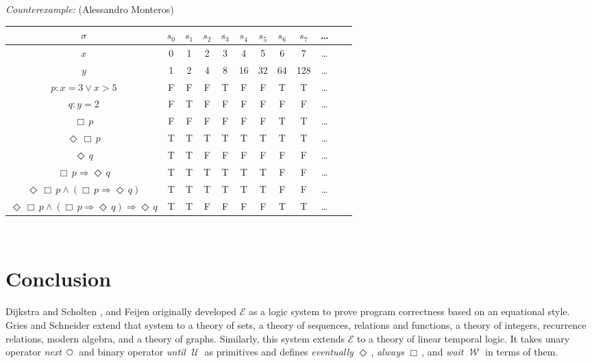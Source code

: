 \documentclass[12pt, fleqn, leqno]{article}
\newcommand{\lgap}{2pt}                             %
\newcommand{\lllgap}{12pt}                          %
\newcommand{\impl}{\ensuremath{\Rightarrow}}        %
\newcommand{\Until}{\;\mathcal{U}\;}
\newcommand{\Wait}{\;\mathcal{W}\;}
\newcommand{\Next}{\;\,\text{\raisebox{3.5pt}{\circle{6}}}}
\newcommand{\Event}{\Diamond\,}
\newcommand{\Always}{\Box\,}
\begin{document}
\emph{Counterexample:} (Alessandro Monteros)\\[\lgap]
\begin{tabular}{c|ccccccccccc}
  $\sigma$                                                     & $s_0$ & $s_1$ & $s_2$ & $s_3$ & $s_4$ & $s_5$ & $s_6$ & $s_7$ & \dots\\
  \hline
  $x$                                                          & 0     & 1     & 2     & 3     & 4     & 5     & 6     & 7     & \dots\\
  $y$                                                          & 1     & 2     & 4     & 8     & 16    & 32    & 64    & 128   & \dots\\
  $p: x=3\lor x>5$                                             & F     & F     & F     & T     & F     & F     & T     & T     & \dots\\
  $q: y=2$                                                     & F     & T     & F     & F     & F     & F     & F     & F     & \dots\\
  $\Always p$                                                  & F     & F     & F     & F     & F     & F     & T     & T     & \dots\\
  $\Event\Always p$                                            & T     & T     & T     & T     & T     & T     & T     & T     & \dots\\
  $\Event q$                                                   & T     & T     & F     & F     & F     & F     & F     & F     & \dots\\
  $\Always p\impl\Event q$                                     & T     & T     & T     & T     & T     & T     & F     & F     & \dots\\
  $\Event\Always p\land (\Always p\impl\Event q)$              & T     & T     & T     & T     & T     & T     & F     & F     & \dots\\
  $\Event\Always p\land (\Always p\impl\Event q)\impl\Event q$ & T     & T     & F     & F     & F     & F     & T     & T     & \dots\\
\end{tabular}\\[\lllgap]

\section{Conclusion}

Dijkstra and Scholten \cite{DandS}, and Feijen \cite{Feij} originally developed $\mathcal{E}$ as a logic system to prove
program correctness based on an equational style.
Gries and Schneider extend that system to a theory of sets, a theory of sequences,
relations and functions, a theory of integers, recurrence relations, modern algebra, and a theory of graphs.
Similarly, this system extends $\mathcal{E}$ to a theory of linear temporal logic.
It takes unary operator \textit{next} $\Next$ and binary operator \textit{until} $\Until$ as primitives and defines
\textit{eventually} $\Event$, \textit{always} $\Always$, and \textit{wait} $\Wait$ in terms of them.
\end{document}
